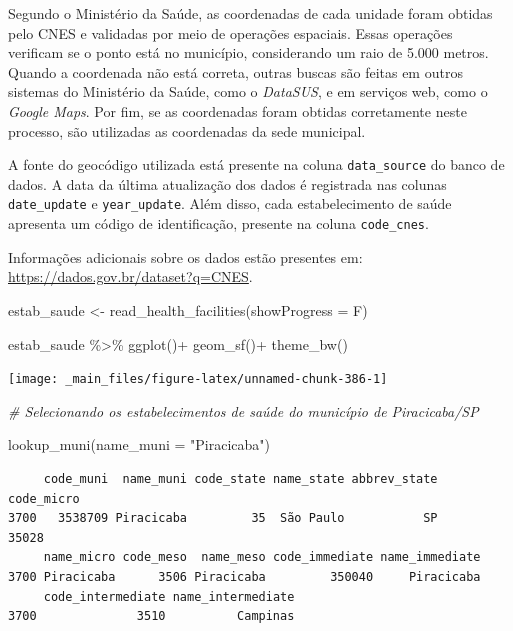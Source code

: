 \documentclass[
  brazilian,
]{book}
\newenvironment{Shaded}{\begin{snugshade}}{\end{snugshade}}
\newcommand{\AttributeTok}[1]{\textcolor[rgb]{0.77,0.63,0.00}{#1}}
\newcommand{\CommentTok}[1]{\textcolor[rgb]{0.56,0.35,0.01}{\textit{#1}}}
\newcommand{\FunctionTok}[1]{\textcolor[rgb]{0.00,0.00,0.00}{#1}}
\newcommand{\NormalTok}[1]{#1}
\newcommand{\OtherTok}[1]{\textcolor[rgb]{0.56,0.35,0.01}{#1}}
\newcommand{\SpecialCharTok}[1]{\textcolor[rgb]{0.00,0.00,0.00}{#1}}
\newcommand{\StringTok}[1]{\textcolor[rgb]{0.31,0.60,0.02}{#1}}
\begin{document}
Segundo o Ministério da Saúde, as coordenadas de cada unidade foram obtidas pelo CNES e validadas por meio de operações espaciais. Essas operações verificam se o ponto está no município, considerando um raio de 5.000 metros. Quando a coordenada não está correta, outras buscas são feitas em outros sistemas do Ministério da Saúde, como o \emph{DataSUS}, e em serviços web, como o \emph{Google Maps}. Por fim, se as coordenadas foram obtidas corretamente neste processo, são utilizadas as coordenadas da sede municipal.

A fonte do geocódigo utilizada está presente na coluna \texttt{data\_source} do banco de dados. A data da última atualização dos dados é registrada nas colunas \texttt{date\_update} e \texttt{year\_update}. Além disso, cada estabelecimento de saúde apresenta um código de identificação, presente na coluna \texttt{code\_cnes}.

Informações adicionais sobre os dados estão presentes em: \url{https://dados.gov.br/dataset?q=CNES}.

\begin{Shaded}
\begin{Highlighting}[]
\NormalTok{estab\_saude }\OtherTok{\textless{}{-}} \FunctionTok{read\_health\_facilities}\NormalTok{(}\AttributeTok{showProgress =}\NormalTok{ F)}

\NormalTok{estab\_saude }\SpecialCharTok{\%\textgreater{}\%} 
  \FunctionTok{ggplot}\NormalTok{()}\SpecialCharTok{+}
  \FunctionTok{geom\_sf}\NormalTok{()}\SpecialCharTok{+}
  \FunctionTok{theme\_bw}\NormalTok{()}
\end{Highlighting}
\end{Shaded}

\begin{center}\texttt{[image: \_main\_files/figure-latex/unnamed-chunk-386-1]} \end{center}

\begin{Shaded}
\begin{Highlighting}[]
\CommentTok{\# Selecionando os estabelecimentos de saúde do município de Piracicaba/SP}

\FunctionTok{lookup\_muni}\NormalTok{(}\AttributeTok{name\_muni =} \StringTok{"Piracicaba"}\NormalTok{)}
\end{Highlighting}
\end{Shaded}

\begin{verbatim}
     code_muni  name_muni code_state name_state abbrev_state code_micro
3700   3538709 Piracicaba         35  São Paulo           SP      35028
     name_micro code_meso  name_meso code_immediate name_immediate
3700 Piracicaba      3506 Piracicaba         350040     Piracicaba
     code_intermediate name_intermediate
3700              3510          Campinas
\end{verbatim}
\end{document}
